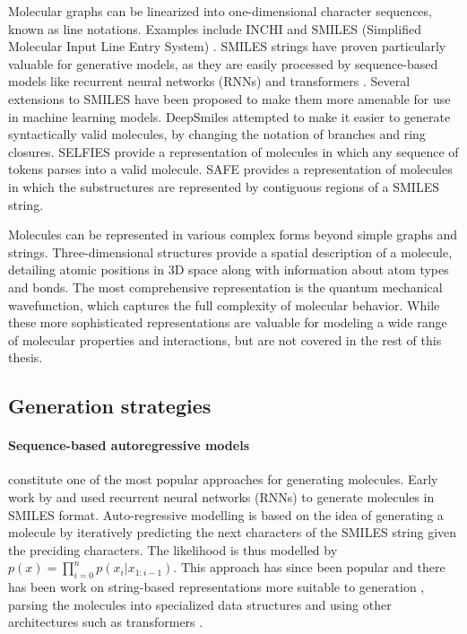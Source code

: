 Molecular graphs can be linearized into one-dimensional character sequences, known as line
notations. Examples include INCHI \citep{hellerInChIIUPACInternational2015} and SMILES (Simplified
Molecular Input Line Entry System) \citep{weiningerSMILESChemicalLanguage1988}. SMILES strings have
proven particularly valuable for generative models, as they are easily processed by sequence-based
models like recurrent neural networks (RNNs) and transformers \citep{vaswaniAttentionAllYou2017}.
Several extensions to SMILES have been proposed to make them more amenable for use in
machine learning models. DeepSmiles \citep{oboyleDeepSMILESAdaptationSMILES2018} attempted
to make it easier to generate syntactically valid molecules, by changing the notation of
branches and ring closures. SELFIES \citep{krennSELFIESFutureMolecular2022} provide a
representation of molecules in which any sequence of tokens parses into a valid molecule.
SAFE \citep{noutahiGottaBeSAFE2023} provides a representation of molecules in which the
substructures are represented by contiguous regions of a SMILES string.

Molecules can be represented in various complex forms beyond simple graphs and strings.
Three-dimensional structures provide a spatial description of a molecule, detailing atomic positions
in 3D space along with information about atom types and bonds. The most comprehensive representation
is the quantum mechanical wavefunction, which captures the full complexity of molecular behavior.
While these more sophisticated representations are valuable for modeling a wide range of molecular
properties and interactions, but are not covered in the rest of this thesis.

\subsection{Generation strategies}
\paragraph{Sequence-based autoregressive models} constitute one of the most popular approaches for
generating molecules. Early work by \citep{seglerGeneratingFocusedMolecule2018} and
\citep{gomez-bombarelliAutomaticChemicalDesign2018} used recurrent neural networks (RNNs) to
generate molecules in SMILES format. Auto-regressive modelling is based on the idea of generating a
molecule by iteratively predicting the next characters of the SMILES string given the preciding
characters. The likelihood is thus modelled by $p(x) = \prod_{i=0}^n p(x_i | x_{1:i-1})$. This
approach has since been popular and there has been work on string-based representations more
suitable to generation
\citep{oboyleDeepSMILESAdaptationSMILES2018,krennSelfReferencingEmbeddedStrings2020}, parsing the
molecules into specialized data structures
\citep{kusnerGrammarVariationalAutoencoder2017,jinJunctionTreeVariational2018} and using other
architectures such as transformers \citep{vaswaniAttentionAllYou2017,noutahiGottaBeSAFE2023,schwallerMolecularTransformerModel2019,bagalMolGPTMolecularGeneration2022,mazuzMoleculeGenerationUsing2023}.

